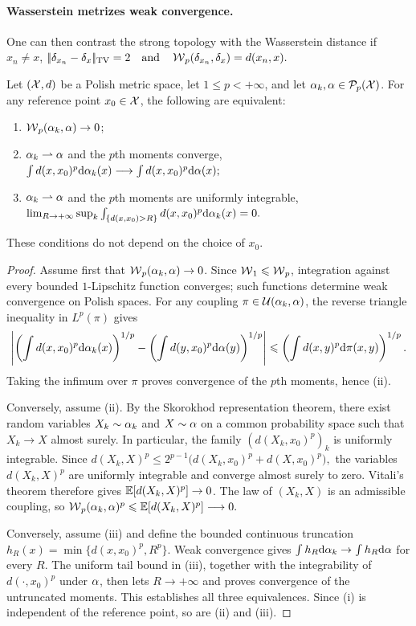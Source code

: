 \paragraph{Wasserstein metrizes weak convergence.}
One can then contrast the strong topology with the Wasserstein distance if $x_n \neq x$, \(|\!| \delta_{x_n}-\delta_x |\!|_{\operatorname{TV}}=2 \quad \text{and} \quad \operatorname{\mathcal{W}}_p(\delta_{x_n},\delta_x) = d(x_n,x).\)
\begin{prop}\label{prop-wass-topology-polish}
Let $(\mathcal{X},d)$ be a Polish metric space, let $1\leq p<+\infty$, and let $\alpha_k,\alpha\in\mathcal{P}_p(\mathcal{X})$. For any reference point $x_0\in\mathcal{X}$, the following are equivalent:
\begin{enumerate}
\item $\operatorname{\mathcal{W}}_p(\alpha_k,\alpha)\to0$;
\item $\alpha_k\rightharpoonup\alpha$ and the $p$th moments converge,
\(\int d(x,x_0)^p\mathrm{d}\alpha_k(x) \longrightarrow \int d(x,x_0)^p\mathrm{d}\alpha(x);\)
\item $\alpha_k\rightharpoonup\alpha$ and the $p$th moments are uniformly integrable,
\(\lim_{R\to+\infty}\sup_k \int_{\{d(x,x_0)>R\}}d(x,x_0)^p\mathrm{d}\alpha_k(x)=0.\)
\end{enumerate}
These conditions do not depend on the choice of $x_0$.
\end{prop}
\begin{proof}
Assume first that $\operatorname{\mathcal{W}}_p(\alpha_k,\alpha)\to0$. Since $\operatorname{\mathcal{W}}_1\leqslant\operatorname{\mathcal{W}}_p$, integration against every bounded $1$-Lipschitz function converges; such functions determine weak convergence on Polish spaces. For any coupling $\pi\in\mathcal{U}(\alpha_k,\alpha)$, the reverse triangle inequality in $L^p(\pi)$ gives
\[
\left|
\left(\int d(x,x_0)^p\mathrm{d}\alpha_k(x)\right)^{1/p}
-
\left(\int d(y,x_0)^p\mathrm{d}\alpha(y)\right)^{1/p}
\right|
\leqslant
\left(\int d(x,y)^p\mathrm{d}\pi(x,y)\right)^{1/p}.
\]
Taking the infimum over $\pi$ proves convergence of the $p$th moments, hence (ii).

Conversely, assume (ii). By the Skorokhod representation theorem, there exist random variables $X_k\sim\alpha_k$ and $X\sim\alpha$ on a common probability space such that $X_k\to X$ almost surely. In particular, the family $(d(X_k,x_0)^p)_k$ is uniformly integrable. Since
\(d(X_k,X)^p \leq 2^{p-1}\bigl(d(X_k,x_0)^p+d(X,x_0)^p\bigr),\)
the variables $d(X_k,X)^p$ are uniformly integrable and converge almost surely to zero. Vitali's theorem therefore gives $\mathbb{E}[d(X_k,X)^p]\to0$. The law of $(X_k,X)$ is an admissible coupling, so
\(\operatorname{\mathcal{W}}_p(\alpha_k,\alpha)^p\leqslant\mathbb{E}[d(X_k,X)^p]\longrightarrow0.\)

Conversely, assume (iii) and define the bounded continuous truncation $h_R(x)=\min\{d(x,x_0)^p,R^p\}$. Weak convergence gives $\int h_R\mathrm{d}\alpha_k\to\int h_R\mathrm{d}\alpha$ for every $R$. The uniform tail bound in (iii), together with the integrability of $d(\cdot,x_0)^p$ under $\alpha$, then lets $R\to+\infty$ and proves convergence of the untruncated moments. This establishes all three equivalences. Since (i) is independent of the reference point, so are (ii) and (iii).
\end{proof}
